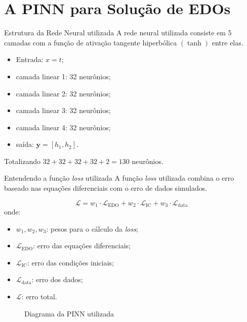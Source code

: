 \section{A PINN para Solução de EDOs}

\begin{frame}{Estrutura da Rede Neural utilizada}
  A rede neural utilizada consiste em 5 camadas com a função de ativação tangente hiperbólica $(\tanh)$ entre elas.

  \begin{itemize}
    \item Entrada: $x = t$;
    \item camada linear 1: 32 neurônios;
    \item camada linear 2: 32 neurônios;
    \item camada linear 3: 32 neurônios;
    \item camada linear 4: 32 neurônios;
    \item saída: $\mathbf{y} = [h_1, h_2]$.
  \end{itemize}

  Totalizando $32+32+32+32+2=130$ neurônios.
\end{frame}

\begin{frame}{Entendendo a função \textit{loss} utilizada}
  A função \textit{loss} utilizada combina o erro baseado nas equações diferenciais com o erro de dados simulados.

  \begin{equation}
    \mathcal{L} = w_1 \cdot \mathcal{L}_{\text{EDO}} + w_2 \cdot \mathcal{L}_{\text{IC}} + w_3 \cdot \mathcal{L}_{\text{data}}
  \end{equation}
  onde:
  \begin{itemize}
    \item $w_1, w_2, w_3$: pesos para o cálculo da \textit{loss};
    \item $\mathcal{L}_{\text{EDO}}$: erro das equações diferenciais;
    \item $\mathcal{L}_{\text{IC}}$: erro das condições iniciais;
    \item $\mathcal{L}_{\text{data}}$: erro dos dados;
    \item $\mathcal{L}$: erro total.
  \end{itemize}
\end{frame}

\begin{frame}
  \begin{figure}
    \centering
    \resizebox{\textwidth}{!}{}
    \caption{Diagrama da PINN utilizada}
  \end{figure}
\end{frame}

